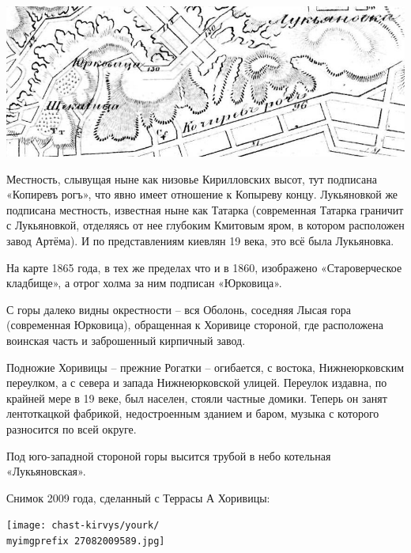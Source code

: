 \begin{center}
\includegraphics[width=\linewidth]{chast-kirvys/yourk/1860-part.jpg}
\end{center} 

Местность, слывущая ныне как низовье Кирилловских высот, тут подписана «Копиревъ рогъ», что явно имеет отношение к Копыреву концу. Лукьяновкой же подписана местность, известная ныне как Татарка (современная Татарка граничит с Лукьяновкой, отделяясь от нее глубоким Кмитовым яром, в котором расположен завод Артёма). И по представлениям киевлян 19 века, это всё была Лукьяновка.


На карте 1865 года, в тех же пределах что и в 1860, изображено «Староверческое кладбище», а отрог холма за ним подписан «Юрковица».
  
С горы далеко видны окрестности – вся Оболонь, соседняя Лысая гора (современная Юрковица), обращенная к Хоривице стороной, где расположена воинская часть и заброшенный кирпичный завод.

Подножие Хоривицы – прежние Рогатки – огибается, с востока, Нижнеюрковским переулком, а с севера и запада Нижнеюрковской улицей. Переулок издавна, по крайней мере в 19 веке, был населен, стояли частные домики. Теперь он занят лентоткацкой фабрикой, недостроенным зданием и баром, музыка с которого разносится по всей округе. 

Под юго-западной стороной горы высится трубой в небо котельная «Лукьяновская».

Снимок 2009 года, сделанный с Террасы А Хоривицы: 

\begin{center}
\texttt{[image: chast-kirvys/yourk/\\myimgprefix 27082009589.jpg]}
\end{center} 


